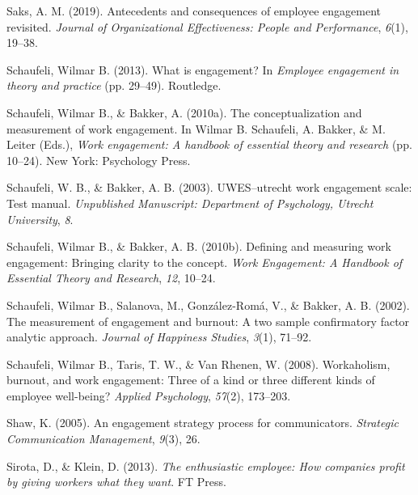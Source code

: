 \documentclass[
  man]{apa6}
\newlength{\cslhangindent}
\newlength{\cslentryspacingunit} %
\newenvironment{CSLReferences}[2] %
 {%
  \setlength{\parindent}{0pt}
  \ifodd #1
  \let\oldpar\par
  \def\par{\hangindent=\cslhangindent\oldpar}
  \fi
  \setlength{\parskip}{#2\cslentryspacingunit}
 }%
 {}
\begin{document}
\begin{CSLReferences}{1}{0}
\leavevmode{}%
Saks, A. M. (2019). Antecedents and consequences of employee engagement revisited. \emph{Journal of Organizational Effectiveness: People and Performance}, \emph{6}(1), 19--38.

\leavevmode{}%
Schaufeli, Wilmar B. (2013). What is engagement? In \emph{Employee engagement in theory and practice} (pp. 29--49). Routledge.

\leavevmode{}%
Schaufeli, Wilmar B., \& Bakker, A. (2010a). The conceptualization and measurement of work engagement. In Wilmar B. Schaufeli, A. Bakker, \& M. Leiter (Eds.), \emph{Work engagement: A handbook of essential theory and research} (pp. 10--24). New York: Psychology Press.

\leavevmode{}%
Schaufeli, W. B., \& Bakker, A. B. (2003). {UWES}--utrecht work engagement scale: Test manual. \emph{Unpublished Manuscript: Department of Psychology, Utrecht University}, \emph{8}.

\leavevmode{}%
Schaufeli, Wilmar B., \& Bakker, A. B. (2010b). Defining and measuring work engagement: Bringing clarity to the concept. \emph{Work Engagement: A Handbook of Essential Theory and Research}, \emph{12}, 10--24.

\leavevmode{}%
Schaufeli, Wilmar B., Salanova, M., González-Romá, V., \& Bakker, A. B. (2002). The measurement of engagement and burnout: A two sample confirmatory factor analytic approach. \emph{Journal of Happiness Studies}, \emph{3}(1), 71--92.

\leavevmode{}%
Schaufeli, Wilmar B., Taris, T. W., \& Van Rhenen, W. (2008). Workaholism, burnout, and work engagement: Three of a kind or three different kinds of employee well-being? \emph{Applied Psychology}, \emph{57}(2), 173--203.

\leavevmode{}%
Shaw, K. (2005). An engagement strategy process for communicators. \emph{Strategic Communication Management}, \emph{9}(3), 26.

\leavevmode{}%
Sirota, D., \& Klein, D. (2013). \emph{The enthusiastic employee: How companies profit by giving workers what they want}. FT Press.


\end{CSLReferences}
\end{document}
